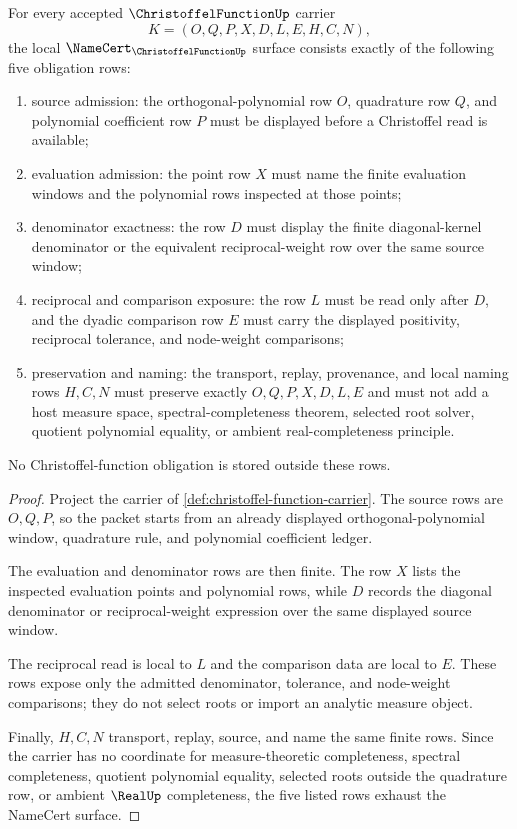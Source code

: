 \begin{theorem}
\label{thm:christoffel-function-namecert-obligations}
For every accepted $\ChristoffelFunctionUp$ carrier
$$
K=(O,Q,P,X,D,L,E,H,C,N),
$$
the local $\NameCert_{\ChristoffelFunctionUp}$ surface consists exactly of the following five obligation rows:
\begin{enumerate}
\item source admission: the orthogonal-polynomial row $O$, quadrature row $Q$, and polynomial coefficient row $P$ must be displayed before a Christoffel read is available;
\item evaluation admission: the point row $X$ must name the finite evaluation windows and the polynomial rows inspected at those points;
\item denominator exactness: the row $D$ must display the finite diagonal-kernel denominator or the equivalent reciprocal-weight row over the same source window;
\item reciprocal and comparison exposure: the row $L$ must be read only after $D$, and the dyadic comparison row $E$ must carry the displayed positivity, reciprocal tolerance, and node-weight comparisons;
\item preservation and naming: the transport, replay, provenance, and local naming rows $H,C,N$ must preserve exactly $O,Q,P,X,D,L,E$ and must not add a host measure space, spectral-completeness theorem, selected root solver, quotient polynomial equality, or ambient real-completeness principle.
\end{enumerate}
No Christoffel-function obligation is stored outside these rows.
\end{theorem}
\begin{proof}
Project the carrier of \autoref{def:christoffel-function-carrier}. The source rows are $O,Q,P$, so the packet starts from an already displayed orthogonal-polynomial window, quadrature rule, and polynomial coefficient ledger.

The evaluation and denominator rows are then finite. The row $X$ lists the inspected evaluation points and polynomial rows, while $D$ records the diagonal denominator or reciprocal-weight expression over the same displayed source window.

The reciprocal read is local to $L$ and the comparison data are local to $E$. These rows expose only the admitted denominator, tolerance, and node-weight comparisons; they do not select roots or import an analytic measure object.

Finally, $H,C,N$ transport, replay, source, and name the same finite rows. Since the carrier has no coordinate for measure-theoretic completeness, spectral completeness, quotient polynomial equality, selected roots outside the quadrature row, or ambient $\RealUp$ completeness, the five listed rows exhaust the NameCert surface.
\end{proof}

